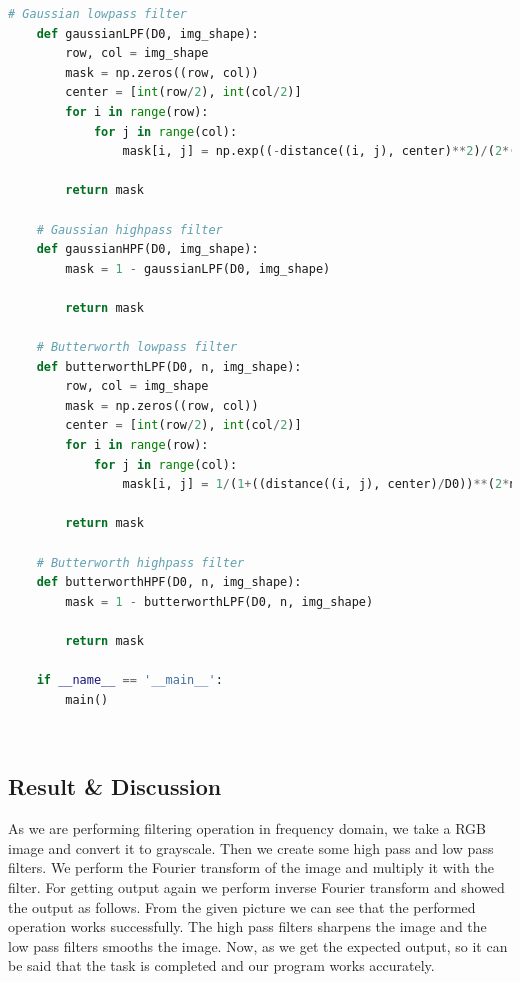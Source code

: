 \documentclass{article}
\begin{document}
{\begin{lstlisting}[language=Python, caption=Code for applying filters in frequency domain]
    # Gaussian lowpass filter
    def gaussianLPF(D0, img_shape):
        row, col = img_shape
        mask = np.zeros((row, col))
        center = [int(row/2), int(col/2)]
        for i in range(row):
            for j in range(col):
                mask[i, j] = np.exp((-distance((i, j), center)**2)/(2*(D0**2)))
        
        return mask
    
    # Gaussian highpass filter
    def gaussianHPF(D0, img_shape):
        mask = 1 - gaussianLPF(D0, img_shape)
        
        return mask
    
    # Butterworth lowpass filter
    def butterworthLPF(D0, n, img_shape):
        row, col = img_shape
        mask = np.zeros((row, col))
        center = [int(row/2), int(col/2)]
        for i in range(row):
            for j in range(col):
                mask[i, j] = 1/(1+((distance((i, j), center)/D0))**(2*n))
        
        return mask
    
    # Butterworth highpass filter
    def butterworthHPF(D0, n, img_shape):
        mask = 1 - butterworthLPF(D0, n, img_shape)
    
        return mask
    
    if __name__ == '__main__':
        main()

    \end{lstlisting}
    \\
    
    \subsection{Result & Discussion}{
        As we are performing filtering operation in frequency domain, we take a RGB image and convert it to grayscale. Then we create some high pass and low pass filters. We perform the Fourier transform of the image and multiply it with the filter. For getting output again we perform inverse Fourier transform and showed the output as follows. From the given picture we can see that the performed operation works successfully. The high pass filters sharpens the image and the low pass filters smooths the image. Now, as we get the expected output, so it can be said that the task is completed and our program works accurately.
        
}}
\end{document}
